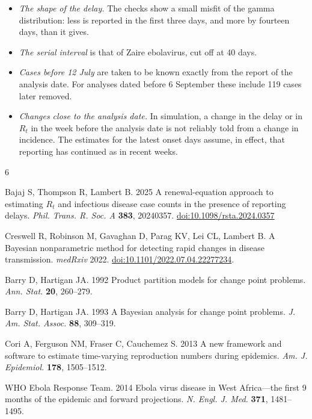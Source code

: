 \documentclass[11pt,a4paper]{article}
\begin{document}
\begin{itemize}[itemsep=2pt]
\item \emph{The shape of the delay.} The checks show a small misfit of the
gamma distribution: less is reported in the first three days, and more by
fourteen days, than it gives.
\item \emph{The serial interval} is that of Zaire ebolavirus, cut off at 40
days.
\item \emph{Cases before 12 July} are taken to be known exactly from the
report of the analysis date. For analyses dated before 6 September these
include 119 cases later removed.
\item \emph{Changes close to the analysis date.} In simulation, a change in
the delay or in $R_t$ in the week before the analysis date is not reliably
told from a change in incidence. The estimates for the latest onset days
assume, in effect, that reporting has continued as in recent weeks.
\end{itemize}

\begin{thebibliography}{6}

Bajaj S, Thompson R, Lambert B. 2025
A renewal-equation approach to estimating $R_t$ and infectious disease case
counts in the presence of reporting delays.
\emph{Phil. Trans. R. Soc. A} \textbf{383}, 20240357.
\href{https://doi.org/10.1098/rsta.2024.0357}{doi:10.1098/rsta.2024.0357}

Creswell R, Robinson M, Gavaghan D, Parag KV, Lei CL, Lambert B. A Bayesian
nonparametric method for detecting rapid changes in disease transmission.
\emph{medRxiv} 2022.
\href{https://doi.org/10.1101/2022.07.04.22277234}{doi:10.1101/2022.07.04.22277234}.

Barry D, Hartigan JA. 1992
Product partition models for change point problems.
\emph{Ann. Stat.} \textbf{20}, 260--279.

Barry D, Hartigan JA. 1993
A Bayesian analysis for change point problems.
\emph{J. Am. Stat. Assoc.} \textbf{88}, 309--319.

Cori A, Ferguson NM, Fraser C, Cauchemez S. 2013
A new framework and software to estimate time-varying reproduction numbers
during epidemics.
\emph{Am. J. Epidemiol.} \textbf{178}, 1505--1512.

WHO Ebola Response Team. 2014
Ebola virus disease in West Africa---the first 9 months of the epidemic and
forward projections.
\emph{N. Engl. J. Med.} \textbf{371}, 1481--1495.
\end{thebibliography}
\end{document}
